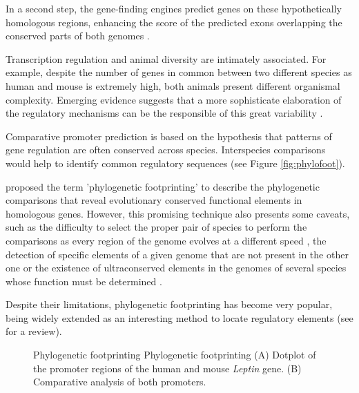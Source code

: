 In a second step, the gene-finding engines predict genes on these hypothetically homologous 
regions, enhancing the score of the predicted exons overlapping the conserved parts of both genomes 
\citep{batzoglou:2000a,parra:2003a}.



Transcription regulation and animal diversity are intimately associated. For example, despite the 
number of genes in common between two different species as human and mouse is extremely high,
both animals present different organismal complexity. Emerging evidence suggests that a more sophisticate
elaboration of the regulatory mechanisms can be the responsible of this great variability 
\citep{levine:2003a}.

Comparative promoter prediction is based on the hypothesis that patterns of gene regulation are
often conserved across species. Interspecies comparisons would help to identify common regulatory
sequences (see Figure \ref{fig:phylofoot}). 

\citet{tagle:1988a} proposed the term 'phylogenetic footprinting' 
to describe the phylogenetic
comparisons that reveal evolutionary conserved functional elements in homologous genes. 
However, this promising technique also presents some caveats, such as the difficulty to
select the proper pair of species to perform the comparisons as every region of the genome
evolves at a different speed \citep{duret:1997a}, the detection of specific elements of a
given genome that are not present in the other one \citep{dermitzakis:2002a} or the existence
of ultraconserved elements in the genomes of several species whose function must be determined
\citep{bejerano:2004a}.

Despite their limitations, phylogenetic footprinting has become very popular, being widely
extended as an interesting method to locate regulatory elements (see 
\citet{zhang:2003a,wasserman:2004a} for a review).

\begin{figure}[t!]
\begin{center}
\setlength{\fboxsep}{2pt}
          {Phylogenetic footprinting}%
          {Phylogenetic footprinting}%
          {(A) Dotplot of the promoter regions of the human and mouse \emph{Leptin} gene. (B) Comparative
analysis of both promoters.}
\end{center}
\end{figure}


